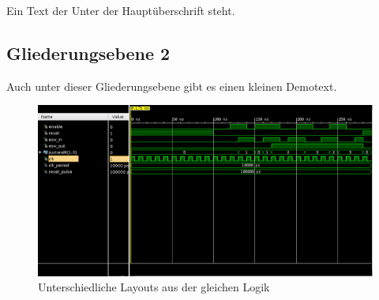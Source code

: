 Ein Text der Unter der Hauptüberschrift steht.

\subsection{Gliederungsebene 2}
\label{kap:Gliederungsebene 2}
Auch unter dieser Gliederungsebene gibt es einen kleinen Demotext.

\begin{figure}[h]
        \centering
        \includegraphics[scale=0.3]{img/simulation.png}
        \caption{Unterschiedliche Layouts aus der gleichen Logik}
        \label{fig:Different_Images}
\end{figure}

